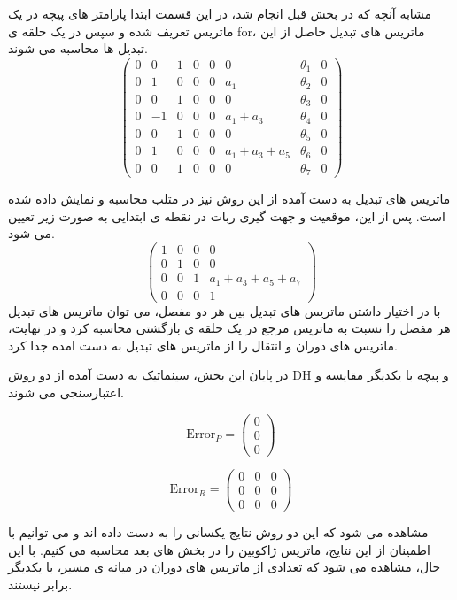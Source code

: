 مشابه آنچه که در بخش قبل انجام شد، در این قسمت ابتدا پارامتر های پیچه در یک ماتریس تعریف شده و سپس در یک حلقه ی for، ماتریس های تبدیل حاصل از این تبدیل ها محاسبه می شوند. 
\[
\begin{pmatrix}
	0 & 0 & 1 & 0 & 0 & 0 & \theta_1 & 0 \\
	0 & 1 & 0 & 0 & 0 & a_1 & \theta_2 & 0 \\
	0 & 0 & 1 & 0 & 0 & 0 & \theta_3 & 0 \\
	0 & -1 & 0 & 0 & 0 & a_1 + a_3 & \theta_4 & 0 \\
	0 & 0 & 1 & 0 & 0 & 0 & \theta_5 & 0 \\
	0 & 1 & 0 & 0 & 0 & a_1 + a_3 + a_5 & \theta_6 & 0 \\
	0 & 0 & 1 & 0 & 0 & 0 & \theta_7 & 0
\end{pmatrix}
\]

ماتریس های تبدیل به دست آمده از این روش نیز در متلب محاسبه و نمایش داده شده است.
پس از این، موقعیت و جهت گیری ربات در نقطه ی ابتدایی به صورت زیر تعیین می شود.
\[
\begin{pmatrix}
	1 & 0 & 0 & 0 \\
	0 & 1 & 0 & 0 \\
	0 & 0 & 1 & a_1 + a_3 + a_5 + a_7 \\
	0 & 0 & 0 & 1
\end{pmatrix}
\]
 با در اختیار داشتن ماتریس های تبدیل بین هر دو مفصل، می توان ماتریس های تبدیل هر مفصل را نسبت به ماتریس مرجع در یک حلقه ی بازگشتی محاسبه کرد و در نهایت، ماتریس های دوران و انتقال را از ماتریس های تبدیل به دست امده جدا کرد.
 
 در پایان این بخش، سینماتیک به دست آمده از دو روش DH و پیچه با یکدیگر مقایسه و اعتبارسنجی می شوند.
 
 \[
 \text{Error}_P =
 \begin{pmatrix}
 	0 \\
 	0 \\
 	0
 \end{pmatrix}
 \]
 
 \[
 \text{Error}_R =
 \begin{pmatrix}
 	0 & 0 & 0 \\
 	0 & 0 & 0 \\
 	0 & 0 & 0
 \end{pmatrix}
 \]
 
 مشاهده می شود که این دو روش نتایج یکسانی را به دست داده اند و می توانیم با اطمینان از این نتایج، ماتریس ژاکوبین را در بخش های بعد محاسبه می کنیم. با این حال، مشاهده می شود که تعدادی از ماتریس های دوران در میانه ی مسیر، با یکدیگر برابر نیستند.
 
